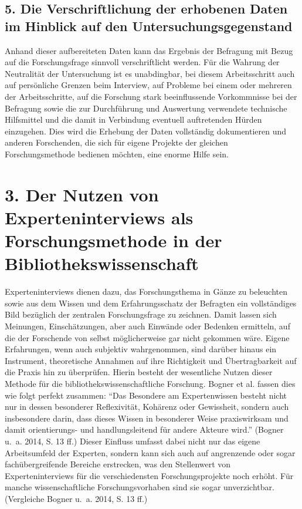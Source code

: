 \documentclass[a4paper,
fontsize=11pt,
oneside,
numbers=noperiodatend,
parskip=half-,
bibliography=totoc,
final
]{scrartcl}
\begin{document}
\subsection{5. Die Verschriftlichung der erhobenen Daten im Hinblick auf
den
Untersuchungsgegenstand}\label{die-verschriftlichung-der-erhobenen-daten-im-hinblick-auf-den-untersuchungsgegenstand}

Anhand dieser aufbereiteten Daten kann das Ergebnis der Befragung mit
Bezug auf die Forschungsfrage sinnvoll verschriftlicht werden. Für die
Wahrung der Neutralität der Untersuchung ist es unabdingbar, bei diesem
Arbeitsschritt auch auf persönliche Grenzen beim Interview, auf Probleme
bei einem oder mehreren der Arbeitsschritte, auf die Forschung stark
beeinflussende Vorkommnisse bei der Befragung sowie die zur Durchführung
und Auswertung verwendete technische Hilfsmittel und die damit in
Verbindung eventuell auftretenden Hürden einzugehen. Dies wird die
Erhebung der Daten vollständig dokumentieren und anderen Forschenden,
die sich für eigene Projekte der gleichen Forschungsmethode bedienen
möchten, eine enorme Hilfe sein.

\section{3. Der Nutzen von Experteninterviews als
Forschungsmethode in der
Bibliothekswissenschaft}\label{der-nutzen-von-experteninterviews-als-forschungsmethode-in-der-bibliothekswissenschaft}

Experteninterviews dienen dazu, das Forschungsthema in Gänze zu
beleuchten sowie aus dem Wissen und dem Erfahrungsschatz der Befragten
ein vollständiges Bild bezüglich der zentralen Forschungsfrage zu
zeichnen. Damit lassen sich Meinungen, Einschätzungen, aber auch
Einwände oder Bedenken ermitteln, auf die der Forschende von selbst
möglicherweise gar nicht gekommen wäre. Eigene Erfahrungen, wenn auch
\textquotesingle subjektiv\textquotesingle{} wahrgenommen, sind darüber
hinaus ein Instrument, theoretische Annahmen auf ihre Richtigkeit und
Übertragbarkeit auf die Praxis hin zu überprüfen. Hierin besteht der
wesentliche Nutzen dieser Methode für die bibliothekswissenschaftliche
Forschung. Bogner et al. fassen dies wie folgt perfekt zusammen:
\enquote{Das Besondere am Expertenwissen besteht nicht nur in dessen
besonderer Reflexivität, Kohärenz oder Gewissheit, sondern auch
insbesondere darin, dass dieses Wissen in besonderer Weise praxiswirksam
und damit orientierungs- und handlungsleitend für andere Akteure wird.}
(Bogner u.~a. 2014, S. 13 ff.) Dieser Einfluss umfasst dabei nicht nur
das eigene Arbeitsumfeld der Experten, sondern kann sich auch auf
angrenzende oder sogar fachübergreifende Bereiche erstrecken, was den
Stellenwert von Experteninterviews für die verschiedensten
Forschungsprojekte noch erhöht. Für manche wissenschaftliche
Forschungsvorhaben sind sie sogar unverzichtbar. (Vergleiche Bogner
u.~a. 2014, S. 13 ff.)
\end{document}
